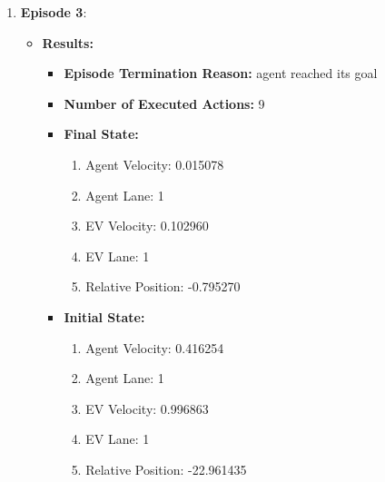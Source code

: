 \begin{enumerate}
    \item \textbf{Episode 3}:
    \begin{itemize}
    \item \textbf{Results:}
    \begin{itemize}
        \item \textbf{Episode Termination Reason:} agent reached its goal
        \item \textbf{Number of Executed Actions:} 9
        \item \textbf{Final State:}
        \begin{enumerate}
            \item Agent Velocity: 0.015078
            \item Agent Lane: 1
            \item EV Velocity: 0.102960
            \item EV Lane: 1
            \item Relative Position: -0.795270
        \end{enumerate}
        \item \textbf{Initial State:}
        \begin{enumerate}
            \item Agent Velocity: 0.416254
            \item Agent Lane: 1
            \item EV Velocity: 0.996863
            \item EV Lane: 1
            \item Relative Position: -22.961435
        \end{enumerate}
    \end{itemize}
 

\end{itemize}
\end{enumerate}
